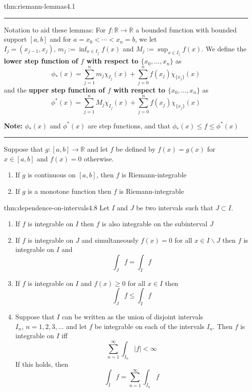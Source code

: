 \documentclass[landscape, 8pt]{extarticle}
\begin{document}
\begin{multicols}{3}
\begin{thm}{thm:riemann-lemmas}{4.1}
	\noindent\rule{\textwidth}{0.2pt}
	Notation to aid these lemmas: For $f : \mathbb{R}\to \mathbb{R}$ a bounded function with bounded support $[a, b]$ and for $a = x_{0} < \cdots < x_{n} = b$, we let $I_{j} = (x_{j - 1}, x_{j}),\, m_{j} := \inf_{x\in I_{j}}f(x)$ and $M_{j} := \sup_{x\in I_{j}} f(x)$. We define the \textbf{lower step function of $f$ with respect to $\{x_{0},\dots,x_{n}\}$} as
	\[\phi_{*}(x) = \sum_{j = 1}^{n} m_{j}\chi_{I_{j}}(x) + \sum_{j = 0}^{n} f(x_{j}) \chi_{\{x_{j}\}}(x)\]
	and the \textbf{upper step function of $f$ with respect to $\{x_{0},\dots,x_{n}\}$} as
	\[\phi^{*}(x) = \sum_{j = 1}^{n} M_{j}\chi_{I_{j}}(x) + \sum_{j = 0}^{n} f(x_{j}) \chi_{\{x_{j}\}}(x)\]

	\textbf{Note:} $\phi_{*}(x)$ and $\phi^{*}(x)$ are step functions, and that $\phi_{*}(x) \le f \le \phi^{*}(x)$

	\noindent\rule{\textwidth}{0.2pt}
	Suppose that $g : [a, b] \to \mathbb{R}$ and let $f$ be defined by $f(x) = g(x)$ for $x\in [a,b]$ and $f(x) = 0$ otherwise.
	\begin{enumerate}
	    \setlength\itemsep{0em}
	    \item If $g$ is continuous on $[a, b]$, then $f$ is Riemann-integrable
	    \item If $g$ is a monotone function then $f$ is Riemann-integrable
	\end{enumerate}
\end{thm}

\newpage
\begin{thm}{thm:dependence-on-intervals}{4.8}
	Let $I$ and $J$ be two intervals such that $J \subset I$.
	\begin{enumerate}
	    \item If $f$ is integrable on $I$ then $f$ is also integrable on the subinterval $J$
	    \item If $f$ is integrable on $J$ and simultaneously $f(x) = 0$ for all $x\in I \backslash J$ then $f$ is integrable on $I$ and
			\[\int_{J} f = \int_{I} f\]
		\item If $f$ is integrable on $I$ and $f(x) \ge 0$ for all $x\in I$ then
			\[\int_{J} f \le \int_{I} f\]
		\item Suppose that $I$ can be written as the union of disjoint intervals $I_{n},\, n = 1,2,3,\dots$ and let $f$ be integrable on each of the intervals $I_{n}$. Then $f$ is integrable on $I$ iff
			\[\sum_{n = 1}^{\infty} \int_{I_{n}} \lvert f \rvert < \infty\]
			If this holds, then
			\[\int_{I} f = \sum_{n = 1}^{\infty} \int_{I_{n}} f\]
	\end{enumerate}
\end{thm}



\end{multicols}
\end{document}

